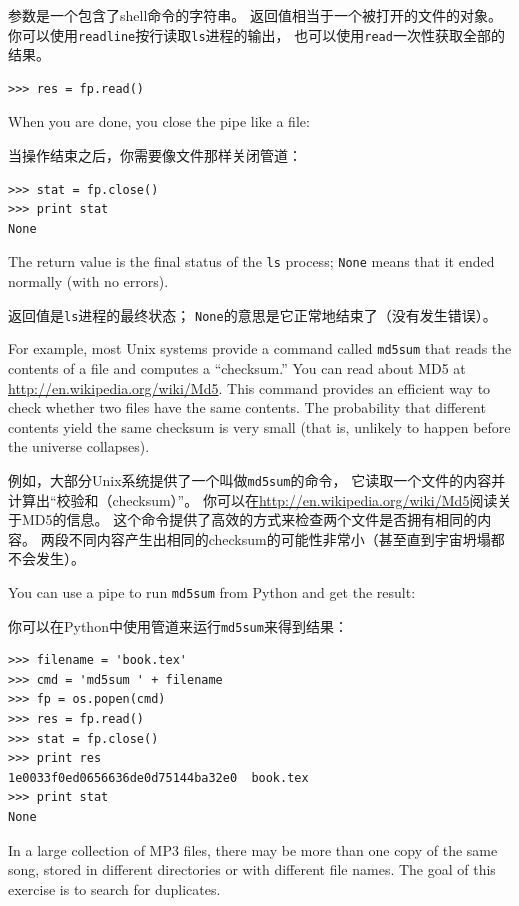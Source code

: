 \documentclass[10pt]{book}
\begin{document}
\begin{CJK}{UTF8}{gbsn}
参数是一个包含了shell命令的字符串。
返回值相当于一个被打开的文件的对象。
你可以使用{\tt readline}按行读取{\tt ls}进程的输出，
也可以使用{\tt read}一次性获取全部的结果。

\begin{verbatim}
>>> res = fp.read()
\end{verbatim}
%
When you are done, you close the pipe like a file:

当操作结束之后，你需要像文件那样关闭管道：

\begin{verbatim}
>>> stat = fp.close()
>>> print stat
None
\end{verbatim}
%
The return value is the final status of the {\tt ls} process;
{\tt None} means that it ended normally (with no errors).

返回值是{\tt ls}进程的最终状态；
{\tt None}的意思是它正常地结束了（没有发生错误）。

For example, most Unix systems provide a command called {\tt md5sum}
that reads the contents of a file and computes a ``checksum.''
You can read about MD5 at \url{http://en.wikipedia.org/wiki/Md5}.  This
command provides an efficient way to check whether two files
have the same contents.  The probability that different contents
yield the same checksum is very small (that is, unlikely to happen
before the universe collapses).

例如，大部分Unix系统提供了一个叫做{\tt md5sum}的命令，
它读取一个文件的内容并计算出``校验和（checksum）''。
你可以在\url{http://en.wikipedia.org/wiki/Md5}阅读关于MD5的信息。
这个命令提供了高效的方式来检查两个文件是否拥有相同的内容。
两段不同内容产生出相同的checksum的可能性非常小（甚至直到宇宙坍塌都不会发生）。

You can use a pipe to run {\tt md5sum} from Python and get the result:

你可以在Python中使用管道来运行{\tt md5sum}来得到结果：

\begin{verbatim}
>>> filename = 'book.tex'
>>> cmd = 'md5sum ' + filename
>>> fp = os.popen(cmd)
>>> res = fp.read()
>>> stat = fp.close()
>>> print res
1e0033f0ed0656636de0d75144ba32e0  book.tex
>>> print stat
None
\end{verbatim}


\begin{exercise}
\label{checksum}

In a large collection of MP3 files, there may be more than one
copy of the same song, stored in different directories or with
different file names.  The goal of this exercise is to search for
duplicates.


\end{exercise}
\end{CJK}
\end{document}
